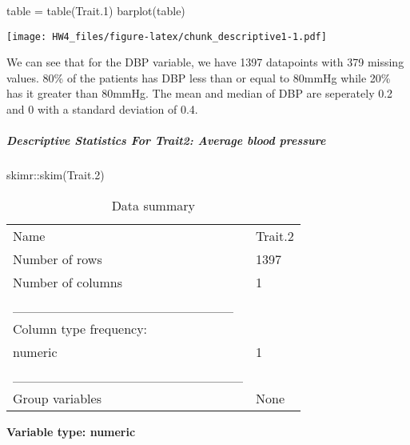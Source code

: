 \documentclass[
]{article}
\newenvironment{Shaded}{\begin{snugshade}}{\end{snugshade}}
\newcommand{\FloatTok}[1]{\textcolor[rgb]{0.00,0.00,0.81}{#1}}
\newcommand{\FunctionTok}[1]{\textcolor[rgb]{0.00,0.00,0.00}{#1}}
\newcommand{\NormalTok}[1]{#1}
\newcommand{\OtherTok}[1]{\textcolor[rgb]{0.56,0.35,0.01}{#1}}
\newcommand{\SpecialCharTok}[1]{\textcolor[rgb]{0.00,0.00,0.00}{#1}}
\begin{document}
\begin{Shaded}
\begin{Highlighting}[]
\NormalTok{table }\OtherTok{=} \FunctionTok{table}\NormalTok{(Trait}\FloatTok{.1}\NormalTok{)}
\FunctionTok{barplot}\NormalTok{(table)}
\end{Highlighting}
\end{Shaded}

\texttt{[image: HW4\_files/figure-latex/chunk\_descriptive1-1.pdf]}

We can see that for the DBP variable, we have 1397 datapoints with 379
missing values. 80\% of the patients has DBP less than or equal to
80mmHg while 20\% has it greater than 80mmHg. The mean and median of DBP
are seperately 0.2 and 0 with a standard deviation of 0.4.

\hypertarget{descriptive-statistics-for-trait2-average-blood-pressure}{%
\subparagraph{Descriptive Statistics For Trait2: Average blood
pressure}\label{descriptive-statistics-for-trait2-average-blood-pressure}}

\begin{Shaded}
\begin{Highlighting}[]
\NormalTok{skimr}\SpecialCharTok{::}\FunctionTok{skim}\NormalTok{(Trait}\FloatTok{.2}\NormalTok{)}
\end{Highlighting}
\end{Shaded}

\begin{longtable}[]{@{}ll@{}}
\caption{Data summary}\tabularnewline
\toprule()
\endhead
Name & Trait.2 \\
Number of rows & 1397 \\
Number of columns & 1 \\
\_\_\_\_\_\_\_\_\_\_\_\_\_\_\_\_\_\_\_\_\_\_\_ & \\
Column type frequency: & \\
numeric & 1 \\
\_\_\_\_\_\_\_\_\_\_\_\_\_\_\_\_\_\_\_\_\_\_\_\_ & \\
Group variables & None \\
\bottomrule()
\end{longtable}

\textbf{Variable type: numeric}
\end{document}
